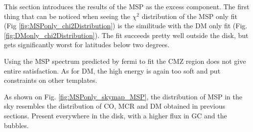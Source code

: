 This section introduces the results of the MSP as the excess component.
The first thing that can be noticed when seeing the $\chi^2$ distribution of the MSP only fit (Fig \ref{fig:MSPonly_chi2Distribution}) is the similitude with the DM only fit (Fig. \ref{fig:DMonly_chi2Distribution}). The fit succeeds pretty well outside the disk, but gets significantly worst for latitudes below two degrees.


Using the MSP spectrum predicted by fermi \cite{Fermi2017} to fit the CMZ region does not give entire satisfaction.
As for DM, the high energy is again too soft and put constraints on other templates.


As shown on Fig. \ref{fig:MSPonly_skymap_MSP}, the distribution of MSP in the sky resembles the distribution of CO, MCR and DM obtained in previous sections. Present everywhere in the disk, with a higher flux in GC and the bubbles.




